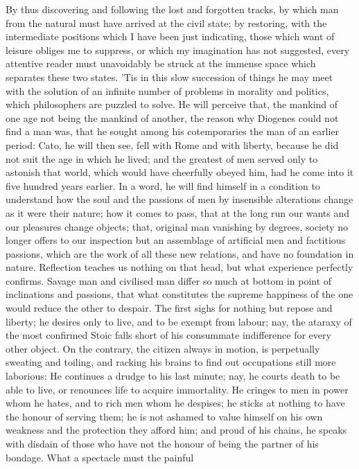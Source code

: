 \documentclass[11pt,twocolumn]{ltugboat}
\begin{document}
By thus discovering and following the lost and forgotten tracks, by
which man from the natural must have arrived at the civil state; by
restoring, with the intermediate positions which I have been just
indicating, those which want of leisure obliges me to suppress, or
which my imagination has not suggested, every attentive reader must
unavoidably be struck at the immense space which separates these two
states. 'Tis in this slow succession of things he may meet with the
solution of an infinite number of problems in morality and politics,
which philosophers are puzzled to solve. He will perceive that, the
mankind of one age not being the mankind of another, the reason why
Diogenes could not find a man was, that he sought among his
cotemporaries the man of an earlier period: Cato, he will then see,
fell with Rome and with liberty, because he did not suit the age in
which he lived; and the greatest of men served only to astonish that
world, which would have cheerfully obeyed him, had he come into it
five hundred years earlier. In a word, he will find himself in a
condition to understand how the soul and the passions of men by
insensible alterations change as it were their nature; how it comes to
pass, that at the long run our wants and our pleasures change objects;
that, original man vanishing by degrees, society no longer offers to
our inspection but an assemblage of artificial men and factitious
passions, which are the work of all these new relations, and have no
foundation in nature. Reflection teaches us nothing on that head, but
what experience perfectly confirms. Savage man and civilised man
differ so much at bottom in point of inclinations and passions, that
what constitutes the supreme happiness of the one would reduce the
other to despair. The first sighs for nothing but repose and liberty;
he desires only to live, and to be exempt from labour; nay, the
ataraxy of the most confirmed Stoic falls short of his consummate
indifference for every other object. On the contrary, the citizen
always in motion, is perpetually sweating and toiling, and racking his
brains to find out occupations still more laborious: He continues a
drudge to his last minute; nay, he courts death to be able to live, or
renounces life to acquire immortality. He cringes to men in power whom
he hates, and to rich men whom he despises; he sticks at nothing to
have the honour of serving them; he is not ashamed to value himself on
his own weakness and the protection they afford him; and proud of his
chains, he speaks with disdain of those who have not the honour of
being the partner of his bondage. What a spectacle must the painful
\end{document}
